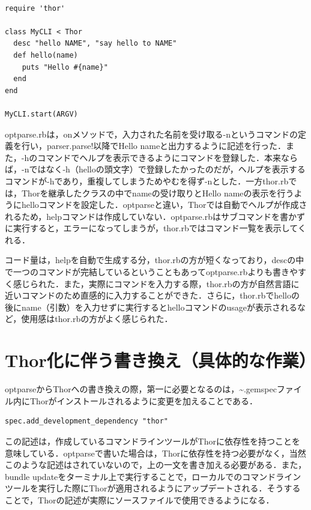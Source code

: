 \begin{screen}
{\small
\begin{verbatim}

require 'thor'

class MyCLI < Thor
  desc "hello NAME", "say hello to NAME"
  def hello(name)
    puts "Hello #{name}"
  end
end

MyCLI.start(ARGV)

\end{verbatim}}
\end{screen}

optparse.rbは，onメソッドで，入力された名前を受け取る-nというコマンドの定義を行い，parser.parse!以降でHello nameと出力するように記述を行った．また，-hのコマンドでヘルプを表示できるようにコマンドを登録した．本来ならば，-nではなく-h（helloの頭文字）で登録したかったのだが，ヘルプを表示するコマンドが-hであり，重複してしまうためやむを得ず-nとした．一方thor.rbでは，Thorを継承したクラスの中でnameの受け取りとHello nameの表示を行うようにhelloコマンドを設定した．optparseと違い，Thorでは自動でヘルプが作成されるため，helpコマンドは作成していない．optparse.rbはサブコマンドを書かずに実行すると，エラーになってしまうが，thor.rbではコマンド一覧を表示してくれる．

コード量は，helpを自動で生成する分，thor.rbの方が短くなっており，descの中で一つのコマンドが完結しているということもあってoptparse.rbよりも書きやすく感じられた．また，実際にコマンドを入力する際，thor.rbの方が自然言語に近いコマンドのため直感的に入力することができた．さらに，thor.rbでhelloの後にname（引数）を入力せずに実行するとhelloコマンドのusageが表示されるなど，使用感はthor.rbの方がよく感じられた．

    \section{Thor化に伴う書き換え（具体的な作業）}\label{thorux5316ux306bux4f34ux3046ux66f8ux304dux63dbux3048ux5177ux4f53ux7684ux306aux4f5cux696d}

optparseからThorへの書き換えの際，第一に必要となるのは，\textasciitilde{}.gemspecファイル内にThorがインストールされるように変更を加えることである．

\begin{verbatim}
spec.add_development_dependency "thor"
\end{verbatim}

この記述は，作成しているコマンドラインツールがThorに依存性を持つことを意味している．optparseで書いた場合は，Thorに依存性を持つ必要がなく，当然このような記述はされていないので，上の一文を書き加える必要がある．また，bundle
updateをターミナル上で実行することで，ローカルでのコマンドラインツールを実行した際にThorが適用されるようにアップデートされる．そうすることで，Thorの記述が実際にソースファイルで使用できるようになる．

